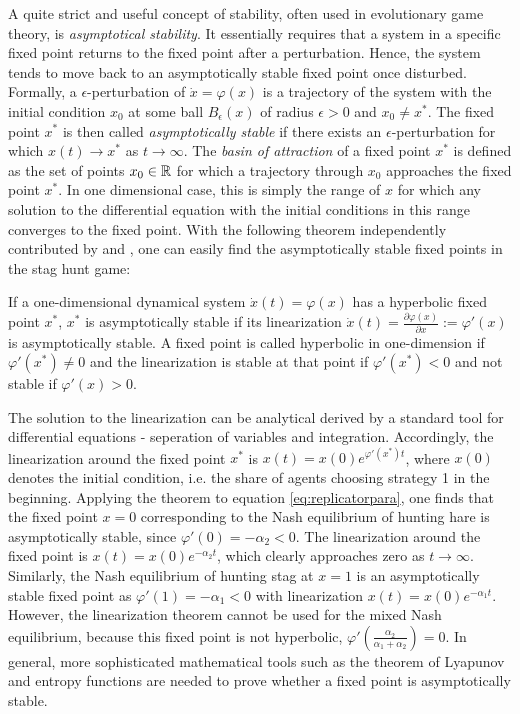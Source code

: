 A quite strict and useful concept of stability, often used in evolutionary 
game theory, is \textit{asymptotical stability}. 
It essentially requires that a system in a specific fixed point returns 
to the fixed point after a perturbation.
Hence, the system tends to move back to an asymptotically stable fixed point
once disturbed. Formally, a $\epsilon$-perturbation of 
$\dot{x} = \varphi(x)$ is a trajectory of the system with the initial
condition $x_0$ at some ball $B_\epsilon(x)$ of radius $\epsilon >0$ and 
$x_0 \neq x^*$. The fixed point $x^*$ is then called \textit{asymptotically
stable} if there exists an $\epsilon$-perturbation for which $x(t) \rightarrow
x^*$ as $t \rightarrow \infty$. 
The \textit{basin of attraction} of a fixed point $x^*$ is defined as the set 
of points $x_0 \in \mathbb{R}$ for which a trajectory through $x_0$ approaches 
the fixed point $x^*$. In one dimensional case, this is simply the range 
of $x$ for which any solution to the differential equation with the initial 
conditions in this range converges to the fixed point. With the following 
theorem independently contributed by \textcite{hartman_lemma_1960} and 
\textcite{grobman_homeomorphism_1959}, one can easily 
find the asymptotically stable fixed points in the stag hunt game:
\begin{mydef}
        If a one-dimensional dynamical system $\dot{x}(t) = \varphi(x)$ 
        has a hyperbolic fixed point $x^*$, $x^*$ is asymptotically stable
        if its linearization 
        $\dot{x}(t) = \frac{\partial\varphi(x)}{\partial x} := \varphi'(x)$ 
        is asymptotically stable. 
        A fixed point is called hyperbolic in one-dimension if 
        $\varphi'(x^*) \neq 0$ and the linearization is stable at that
        point if $\varphi'(x^*) < 0$ and not stable if $\varphi'(x) >0$.
\end{mydef}
The solution to the linearization can be analytical derived by 
a standard tool for differential equations - seperation of variables and 
integration.
Accordingly, the linearization around the fixed point $x^*$ is 
$x(t)= x(0) e^{\varphi'(x^*)t}$, where $x(0)$ denotes the 
initial condition, i.e. the share of agents choosing strategy 1 in the 
beginning.
Applying the theorem to equation \eqref{eq:replicatorpara}, 
one finds that the 
fixed point $x=0$ corresponding to the Nash equilibrium of hunting hare is 
asymptotically stable, since $\varphi'(0) = - \alpha_2 <0$. 
The linearization around the fixed point is $x(t) = x(0) e^{-\alpha_2 t}$, 
which clearly approaches zero as $t \rightarrow \infty$. 
Similarly, the Nash equilibrium 
of hunting stag at $x=1$ is an asymptotically stable fixed point as
$\varphi'(1) = -\alpha_1 <0$ with linearization $x(t) = x(0) e^{-\alpha_1 t}$.
However, the linearization theorem cannot be used for the mixed Nash 
equilibrium, because this fixed point is not hyperbolic, 
$\varphi'(\frac{\alpha_2}{\alpha_1+\alpha_2}) = 0$.
In general, more sophisticated mathematical tools such as the theorem of 
Lyapunov and entropy functions are needed to prove whether a fixed point
is asymptotically stable. 

